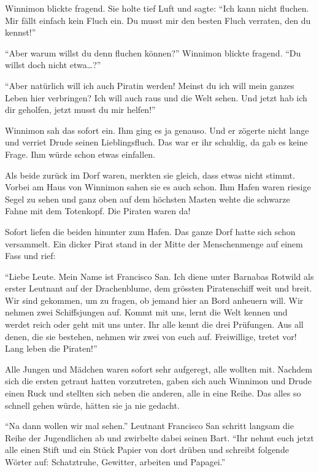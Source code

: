 Winnimon blickte fragend. Sie holte tief Luft und sagte: \enquote{Ich kann nicht fluchen. Mir fällt einfach kein Fluch ein. Du musst mir den besten Fluch verraten, den du kennst!}

\enquote{Aber warum willst du denn fluchen können?} Winnimon blickte fragend. \enquote{Du willst doch nicht etwa\dots?}

\enquote{Aber natürlich will ich auch Piratin werden! Meinst du ich will mein ganzes Leben hier verbringen? Ich will auch raus und die Welt sehen. Und jetzt hab ich dir geholfen, jetzt musst du mir helfen!}

Winnimon sah das sofort ein. Ihm ging es ja genauso. Und er zögerte nicht lange und verriet Drude seinen Lieblingsfluch. Das war er ihr schuldig, da gab es keine Frage. Ihm würde schon etwas einfallen.

Als beide zurück im Dorf waren, merkten sie gleich, dass etwas nicht stimmt. Vorbei am Haus von Winnimon sahen sie es auch schon. Ihm Hafen waren riesige Segel zu sehen und ganz oben auf dem höchsten Masten wehte die schwarze Fahne mit dem Totenkopf. Die Piraten waren da!

Sofort liefen die beiden hinunter zum Hafen. Das ganze Dorf hatte sich schon versammelt. Ein dicker Pirat stand in der Mitte der Menschenmenge auf einem Fass und rief:

\enquote{Liebe Leute. Mein Name ist Francisco San. Ich diene unter Barnabas Rotwild als erster Leutnant auf der Drachenblume, dem grössten Piratenschiff weit und breit. Wir sind gekommen, um zu fragen, ob jemand hier an Bord anheuern will. Wir nehmen zwei Schiffsjungen auf. Kommt mit uns, lernt die Welt kennen und werdet reich oder geht mit uns unter. Ihr alle kennt die drei Prüfungen. Aus all denen, die sie bestehen, nehmen wir zwei von euch auf. Freiwillige, tretet vor! Lang leben die Piraten!}

Alle Jungen und Mädchen waren sofort sehr aufgeregt, alle wollten mit. Nachdem sich die ersten getraut hatten vorzutreten, gaben sich auch Winnimon und Drude einen Ruck und stellten sich neben die anderen, alle in eine Reihe. Das alles so schnell gehen würde, hätten sie ja nie gedacht.

\enquote{Na dann wollen wir mal sehen.} Leutnant Francisco San schritt langsam die Reihe der Jugendlichen ab und zwirbelte dabei seinen Bart. \enquote{Ihr nehmt euch jetzt alle einen Stift und ein Stück Papier von dort drüben und schreibt folgende Wörter auf: Schatztruhe, Gewitter, arbeiten und Papagei.}

